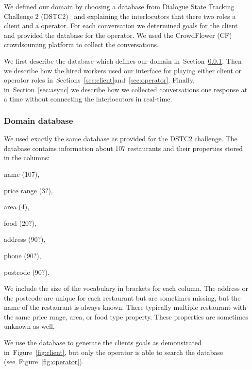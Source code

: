 \documentclass[runningheads,a4paper]{llncs}
\begin{document}
We defined our domain by choosing a database from Dialogue State Tracking Challenge 2 (DSTC2)~\cite{dstc2} and explaining the interlocutors that there two roles a client and a operator.
For each conversation we determined goals for the client and provided the database for the operator.
We used the CrowdFlower (CF) crowdsourcing platform to collect the conversations.

We first describe the database which defines our domain in~Section~\ref{sec:db}.
Then we describe how the hired workers used our interface for playing either client or operator roles in~Sections~\ref{sec:client}and~\ref{sec:operator}.
Finally, in~Section~\ref{sec:async} we describe how we collected conversations one response at a time without connecting the interlocutors in real-time. 

\subsubsection{Domain database}
\label{sec:db}

We used exactly the same database as provided for the DSTC2 challenge.
The database contains information about 107 restaurants and their properties stored in the columns:

\begin{inparaenum}
    \item name (107),
    \item price range (3?),
    \item area (4),
    \item food (20?),
    \item address (90?),
    \item phone (90?),
    \item postcode (90?).
\end{inparaenum}

We include the size of the vocabulary in brackets for each column.
The address or the postcode are unique for each restaurant but are sometimes missing, but the name of the restaurant is always known. 
There typically multiple restaurant with the same price range, area, or food type property.
These properties are sometimes unknown as well.

We use the database to generate the clients goals as demonstrated in~Figure~\ref{fig:client}, but only the operator is able to search the database (see~Figure~\ref{fig:operator}).
\end{document}

